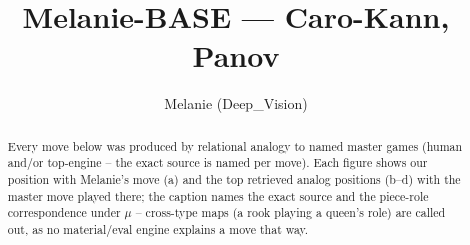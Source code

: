 \documentclass[11pt]{article}
\title{Melanie-BASE — Caro-Kann, Panov}
\author{Melanie (Deep\_Vision)}
\date{}
\begin{document}
\maketitle

\begin{abstract}Every move below was produced by relational analogy to named master games (human and/or top-engine -- the exact source is named per move). Each figure shows our position with Melanie's move (a) and the top retrieved analog positions (b--d) with the master move played there; the caption names the exact source and the piece-role correspondence under $\mu$ -- cross-type maps (a rook playing a queen's role) are called out, as no material/eval engine explains a move that way.\end{abstract}

\begin{figure}[p]\centering
\begin{subfigure}{0.46\textwidth}\centering
\resizebox{\linewidth}{!}{%
\newchessgame
\chessboard[
  setfen={rnbqk2r/pp2bppp/4pn2/2Pp4/3P4/2N2N2/PP3PPP/R1BQKB1R b KQkq - 0 7},
  showmover=false,
  pgfstyle=straightmove, color=movearrow, markmove={e8-g8}
]}
\caption{}
\end{subfigure}\hfill
\begin{subfigure}{0.46\textwidth}\centering
\resizebox{\linewidth}{!}{%
\newchessgame
\chessboard[
  setfen={r1bqkb1r/pp3ppp/2np1n2/2p1p3/4P3/2PP1N2/PP2BPPP/RNBQK2R w KQkq - 0 6},
  showmover=false,
  pgfstyle=straightmove, color=movearrow, markmove={e1-g1}
]}
\caption{}
\end{subfigure}
\\[4pt]
\begin{subfigure}{0.46\textwidth}\centering
\resizebox{\linewidth}{!}{%
\newchessgame
\chessboard[
  setfen={r1bqkb1r/pp3ppp/2n2n2/2pp4/3P4/4PN2/PP2BPPP/RNBQK2R w KQkq - 2 7},
  showmover=false,
  pgfstyle=straightmove, color=movearrow, markmove={e1-g1}
]}
\caption{}
\end{subfigure}\hfill
\begin{subfigure}{0.46\textwidth}\centering
\resizebox{\linewidth}{!}{%
\newchessgame
\chessboard[
  setfen={r1bqkb1r/pp3ppp/2n2n2/2pp4/3P4/5NP1/PP2PPBP/RNBQK2R w KQkq - 3 7},
  showmover=false,
  pgfstyle=straightmove, color=movearrow, markmove={e1-g1}
]}
\caption{}
\end{subfigure}

\end{figure}
\end{document}
